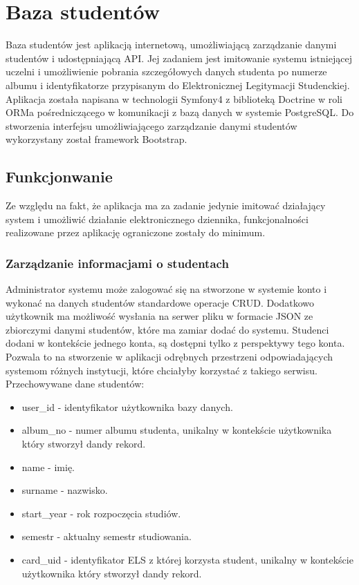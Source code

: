 \documentclass[declaration,shortabstract, mgr]{iithesis}
\begin{document}
\section{Baza studentów}
\indent Baza studentów jest aplikacją internetową, umożliwiającą zarządzanie danymi studentów i udostępniającą API. Jej zadaniem jest imitowanie systemu istniejącej uczelni i umożliwienie pobrania szczegółowych danych studenta po numerze albumu i identyfikatorze przypisanym do Elektronicznej Legitymacji Studenckiej.\\
\indent Aplikacja została napisana w technologii Symfony4\cite{symfony} z biblioteką Doctrine\cite{doctrine} w roli ORMa pośredniczącego w komunikacji z bazą danych w systemie PostgreSQL. Do stworzenia interfejsu umożliwiającego zarządzanie danymi studentów wykorzystany został framework Bootstrap.\\
\subsection{Funkcjonwanie}
\indent Ze względu na fakt, że aplikacja ma za zadanie jedynie imitować działający system i umożliwić działanie elektronicznego dziennika, funkcjonalności realizowane przez aplikację ograniczone zostały do minimum. 
\subsubsection{Zarządzanie informacjami o studentach}
\indent Administrator systemu może zalogować się na stworzone w systemie konto i wykonać na danych studentów standardowe operacje CRUD. Dodatkowo użytkownik ma możliwość wysłania na serwer pliku w formacie JSON ze zbiorczymi danymi studentów, które ma zamiar dodać do systemu. Studenci dodani w kontekście jednego konta, są dostępni tylko z perspektywy tego konta.
Pozwala to na stworzenie w aplikacji odrębnych przestrzeni odpowiadających systemom różnych instytucji, które chciałyby korzystać z takiego serwisu.\\
\indent Przechowywane dane studentów:
\begin{itemize}
\item user\_id - identyfikator użytkownika bazy danych.
\item album\_no - numer albumu studenta, unikalny w kontekście użytkownika który stworzył dandy rekord.
\item name - imię.
\item surname - nazwisko.
\item start\_year - rok rozpoczęcia studiów.
\item semestr - aktualny semestr studiowania.
\item card\_uid - identyfikator ELS z której korzysta student, unikalny w kontekście użytkownika który stworzył dandy rekord.
\end{itemize}
\end{document}
